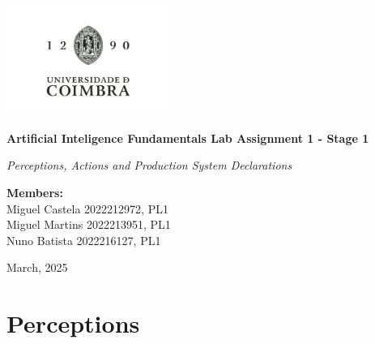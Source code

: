 \documentclass[a4paper, 12pt, fleqn]{report}
\begin{document}
\begin{titlepage}
    \centering
    \vspace*{1cm}
    \includegraphics[width=0.4\textwidth]{uc_logo.jpg}

    {\Huge\bfseries Artificial Inteligence Fundamentals Lab Assignment 1 - Stage 1\par}
    \vspace{0.1cm}
    {\Large\itshape Perceptions, Actions and Production System Declarations \par}
    \vfill
    \vfill
        \begin{center}
            \large
            \textbf{Members: \\}
            Miguel Castela 2022212972, PL1\\
            Miguel Martins 2022213951, PL1\\
            Nuno Batista 2022216127, PL1
    \end{center}
    
    \vfill
    
    {\large March, 2025 \par}
\end{titlepage}

\renewcommand{\contentsname}{Table of Contents}
\tableofcontents
\newpage

\section*{\fontsize{16}{20}\selectfont Perceptions}
\end{document}

